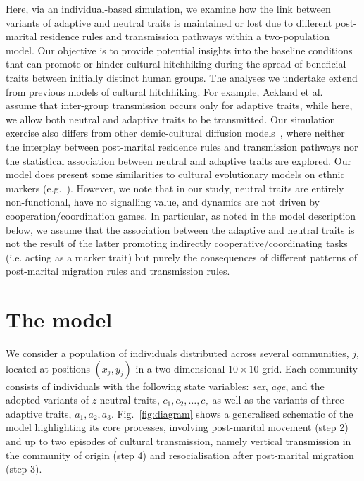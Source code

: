 \documentclass[9pt,twocolumn,twoside,lineno]{pnas-new}
\begin{document}
Here, via an individual-based simulation, we examine how the link between variants of adaptive and neutral traits is maintained or lost due to different post-marital residence rules and transmission pathways within a two-population model. 
Our objective is to provide potential insights into the baseline conditions that can promote or hinder cultural hitchhiking during the spread of beneficial traits between initially distinct human groups.
{\color{red}The analyses we undertake extend from previous models of cultural hitchhiking. For example, Ackland et al.~\citep{ackland_cultural_2007} assume that inter-group transmission occurs only for adaptive traits, while here, we allow both neutral and adaptive traits to be transmitted. 
Our simulation exercise also differs from other demic-cultural diffusion models~\citep[e.g.][]{fort_synthesis_2012}, where neither the interplay between post-marital residence rules and transmission pathways nor the statistical association between neutral and adaptive traits are explored.
Our model does present some similarities to cultural evolutionary models on ethnic markers (e.g.~\citep{boyd_evolution-ethincethnic-markers_1987,mcelreath_share-norm_2003}). 
However, we note that in our study, neutral traits are entirely non-functional, have no signalling value, and dynamics are not driven by cooperation/coordination games. 
In particular, as noted in the model description below, we assume that the association between the adaptive and neutral traits is not the result of the latter promoting indirectly cooperative/coordinating tasks (i.e. acting as a marker trait) but purely the consequences of different patterns of post-marital migration rules and transmission rules. } 


\section*{The model}

We consider a population of individuals distributed across several communities, $j$, located at positions $(x_j,y_j)$ in a two-dimensional $10\times10$ grid. 
Each community consists of individuals with the following state variables: \textit{sex}, \textit{age}, and the adopted variants of $z$ neutral traits, $c_1,c_2,\ldots,c_z$ as well as the variants of three adaptive traits, $a_1,a_2,a_3$.
{\color{red}Fig.~\ref{fig:diagram} shows a generalised schematic of the model highlighting its core processes, involving post-marital movement (step 2) and up to two episodes of cultural transmission, namely vertical transmission in the community of origin (step 4) and resocialisation after post-marital migration (step 3).}   
\end{document}
